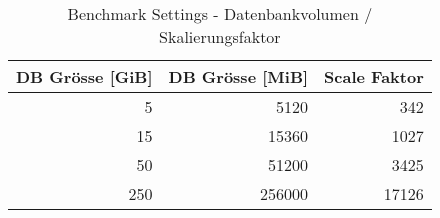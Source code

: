 \begin{table}[H]


\begin{tabular}{rrr}
\toprule
DB Grösse [GiB] & DB Grösse [MiB] & Scale Faktor \\
\midrule
5 & 5120 & 342 \\
15 & 15360 & 1027 \\
50 & 51200 & 3425 \\
250 & 256000 & 17126 \\
\bottomrule
\end{tabular}
\caption{Benchmark Settings - Datenbankvolumen / Skalierungsfaktor} \label{benchmarking_db_sizes}
\end{table}
